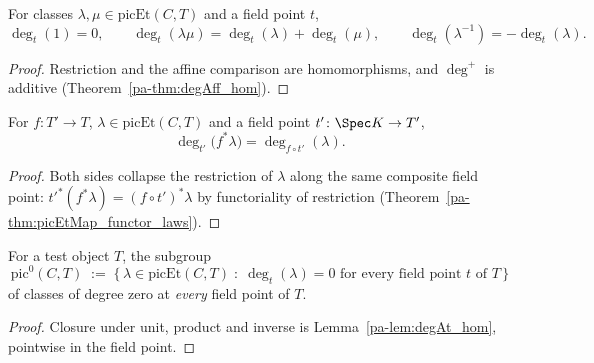\begin{lemma}
  \label{pa-lem:degAt_hom}
  \leanok

  For classes \(\lambda, \mu \in \mathrm{picEt}(C,T)\) and a field point \(t\),
  \[
    \deg_t(1) = 0, \qquad
    \deg_t(\lambda\mu) = \deg_t(\lambda) + \deg_t(\mu), \qquad
    \deg_t(\lambda^{-1}) = -\deg_t(\lambda).
  \]
\end{lemma}
\begin{proof}
  \leanok
  Restriction and the affine comparison are homomorphisms, and \(\deg^{+}\) is additive
  (Theorem~\ref{pa-thm:degAff_hom}).
\end{proof}

\begin{theorem}
  \label{pa-thm:degAt_picEtMap}
  \leanok

  For \(f \colon T' \to T\), \(\lambda \in \mathrm{picEt}(C,T)\) and a field point
  \(t' \colon \Spec K \to T'\),
  \[
    \deg_{t'}\bigl(f^{*}\lambda\bigr) = \deg_{f \circ t'}(\lambda).
  \]
\end{theorem}
\begin{proof}
  \leanok
  Both sides collapse the restriction of \(\lambda\) along the same composite field point:
  \(t'^{*}(f^{*}\lambda) = (f \circ t')^{*}\lambda\) by functoriality of restriction
  (Theorem~\ref{pa-thm:picEtMap_functor_laws}).
\end{proof}

\begin{definition}
  \label{pa-def:pic0Subgroup}
  \leanok

  For a test object \(T\), the subgroup
  \[
    \mathrm{pic}^0(C,T) \;:=\;
    \bigl\{\, \lambda \in \mathrm{picEt}(C,T) \;:\; \deg_t(\lambda) = 0
      \text{ for every field point } t \text{ of } T \,\bigr\}
  \]
  of classes of degree zero at \emph{every} field point of \(T\).
\end{definition}
\begin{proof}
  \leanok
  Closure under unit, product and inverse is Lemma~\ref{pa-lem:degAt_hom}, pointwise in the
  field point.
\end{proof}

